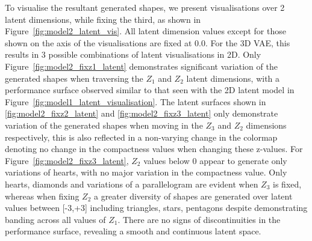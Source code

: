 \documentclass{article}
\begin{document}
To visualise the resultant generated shapes, we present visualisations over 2 latent dimensions, while fixing the third, as shown in Figure~\ref{fig:model2_latent_vis}. All latent dimension values except for those shown on the axis of the visualisations are fixed at $0.0$. For the 3D VAE, this results in 3 possible combinations of latent visualisations in 2D. Only Figure~\ref{fig:model2_fixz1_latent} demonstrates significant variation of the generated shapes when traversing the $Z_1$ and $Z_2$ latent dimensions, with a performance surface observed similar to that seen with the 2D latent model in Figure~\ref{fig:model1_latent_visualisation}. The latent surfaces shown in \ref{fig:model2_fixz2_latent} and \ref{fig:model2_fixz3_latent} only demonstrate variation of the generated shapes when moving in the $Z_3$ and $Z_2$ dimensions respectively, this is also reflected in a non-varying change in the colormap denoting no change in the compactness values when changing these z-values. For Figure~\ref{fig:model2_fixz3_latent}, $Z_2$ values below 0 appear to generate only variations of hearts, with no major variation in the compactness value. Only hearts, diamonds and variations of a parallelogram are evident when $Z_3$ is fixed, whereas when fixing $Z_2$ a greater diversity of shapes are generated over latent values between [-3,+3] including triangles, stars, pentagons despite demonstrating banding across all values of $Z_1$. There are no signs of discontinuities in the performance surface, revealing a smooth and continuous latent space.
\end{document}
